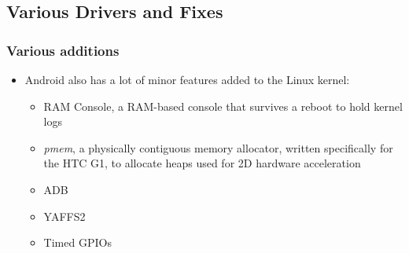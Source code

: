 \subsection{Various Drivers and Fixes}
\begin{frame}
  \frametitle{Various additions}
  \begin{itemize}
  \item Android also has a lot of minor features added to the Linux
    kernel:
    \begin{itemize}
    \item RAM Console, a RAM-based console that survives a reboot to
      hold kernel logs
    \item \textit{pmem}, a physically contiguous memory allocator, written
      specifically for the HTC G1, to allocate heaps used for 2D
      hardware acceleration
    \item ADB
    \item YAFFS2
    \item Timed GPIOs
    \end{itemize}
  \end{itemize}
\end{frame}
